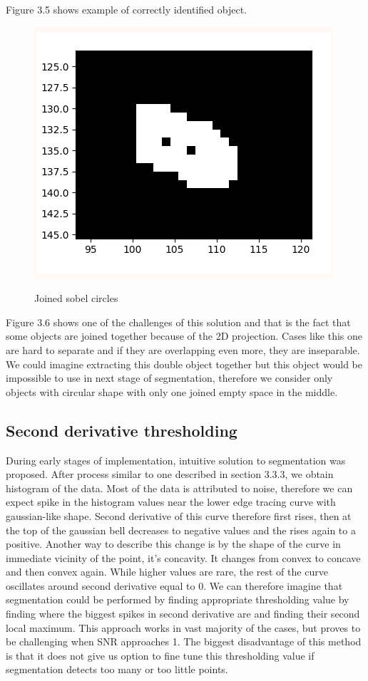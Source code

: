 \documentclass[12pt, a4paper, oneside]{book}
\begin{document}
Figure 3.5 shows example of correctly identified object.

\begin{figure}[H]
    \begin{center}
        \includegraphics[scale=1.50]{images/joined_objects.png}
        \label{img:joined_objects}
        \caption{Joined sobel circles}
    \end{center}
\end{figure}

Figure 3.6 shows one of the challenges of this solution and that is the fact that some objects are joined together because of the 2D projection.
Cases like this one are hard to separate and if they are overlapping even more, they are inseparable.
We could imagine extracting this double object together but this object would be impossible to use in next stage of segmentation, therefore we consider only objects with circular shape with only one joined empty space in the middle.

\subsection{Second derivative thresholding}
During early stages of implementation, intuitive solution to segmentation was proposed.
After process similar to one described in section 3.3.3, we obtain histogram of the data.
Most of the data is attributed to noise, therefore we can expect spike in the histogram values near the lower edge tracing curve with gaussian-like shape.
Second derivative of this curve therefore first rises, then at the top of the gaussian bell decreases to negative values and the rises again to a positive.
Another way to describe this change is by the shape of the curve in immediate vicinity of the point, it's concavity.
It changes from convex to concave and then convex again.
While higher values are rare, the rest of the curve oscillates around second derivative equal to 0.
We can therefore imagine that segmentation could be performed by finding appropriate thresholding value by finding where the biggest spikes in second derivative are and finding their second local maximum.
This approach works in vast majority of the cases, but proves to be challenging when SNR approaches 1.
The biggest disadvantage of this method is that it does not give us option to fine tune this thresholding value if segmentation detects too many or too little points.
\end{document}
